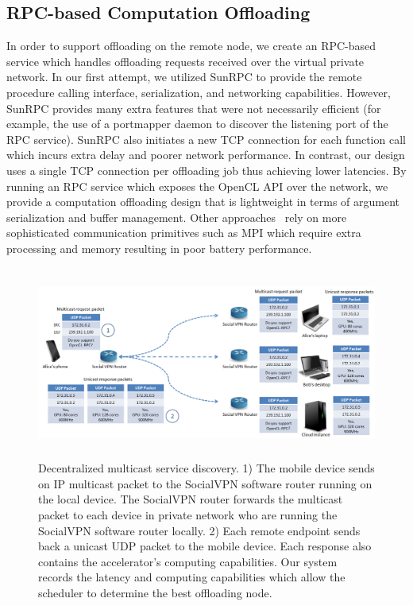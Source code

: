 \documentclass[10pt, conference, compsocconf]{IEEEtran}
\begin{document}
\subsection{RPC-based Computation Offloading}
%
In order to support offloading on the remote node, we create an RPC-based 
service which handles offloading requests received over the virtual private 
network.
%
In our first attempt, we utilized SunRPC to provide the remote procedure 
calling interface, serialization, and networking capabilities.
%
However, SunRPC provides many extra features that were not necessarily 
efficient (for example, the use of a portmapper daemon to discover the 
listening port of the RPC service).
%
SunRPC also initiates a new TCP connection for each function call which 
incurs extra delay and poorer network performance.
%
In contrast, our design uses a single TCP connection per offloading job thus
achieving lower latencies.
%
By running an RPC service which exposes the OpenCL API over the network, we 
provide a computation offloading design that is lightweight in terms of 
argument serialization and buffer management.
%
Other approaches~\cite{vocl} rely on more sophisticated communication primitives such
as MPI which require extra processing and memory resulting in poor battery 
performance.
%
\begin{figure}[ht]
\centering
\includegraphics[height=6.3cm, width=13.8cm]{Figure/discovery}
\caption{Decentralized multicast service discovery.
%
1) The mobile device sends on IP multicast packet to the SocialVPN
software router running on the local device.
%
The SocialVPN router forwards the multicast packet to each device in
private network who are running the SocialVPN software router locally.
%
2) Each remote endpoint sends back a unicast UDP packet to the mobile
device.
%
Each response also contains the accelerator's computing capabilities.
%
Our system records the latency and computing capabilities which allow
the scheduler to determine the best offloading node.
}
\end{figure}
%
\end{document}
